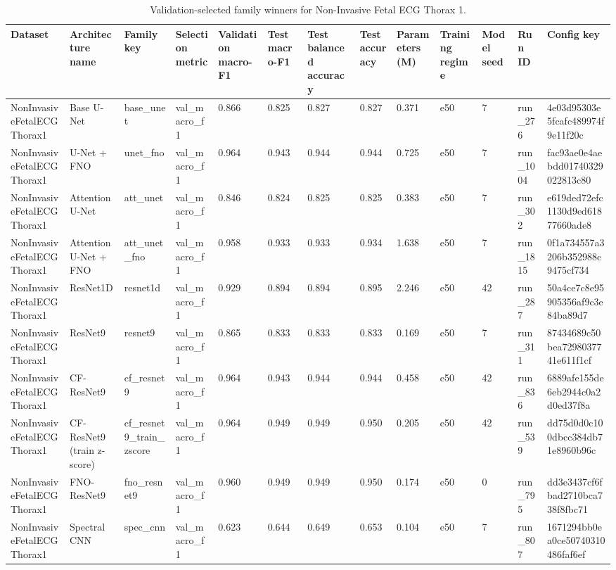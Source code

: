 \begin{table}
\caption{Validation-selected family winners for Non-Invasive Fetal ECG Thorax 1.}
\label{tab:noninvasivefetalecgthorax1_best_model_performance}
\begin{tabular}{lllllllllllll}
\toprule
Dataset & Architecture name & Family key & Selection metric & Validation macro-F1 & Test macro-F1 & Test balanced accuracy & Test accuracy & Parameters (M) & Training regime & Model seed & Run ID & Config key \\
\midrule
NonInvasiveFetalECGThorax1 & Base U-Net & base\_unet & val\_macro\_f1 & 0.866 & 0.825 & 0.827 & 0.827 & 0.371 & e50 & 7 & run\_276 & 4e03d95303e5fcafc489974f9e11f20c \\
NonInvasiveFetalECGThorax1 & U-Net + FNO & unet\_fno & val\_macro\_f1 & 0.964 & 0.943 & 0.944 & 0.944 & 0.725 & e50 & 7 & run\_1004 & fac93ae0e4aebdd01740329022813c80 \\
NonInvasiveFetalECGThorax1 & Attention U-Net & att\_unet & val\_macro\_f1 & 0.846 & 0.824 & 0.825 & 0.825 & 0.383 & e50 & 7 & run\_302 & e619ded72efc1130d9ed61877660ade8 \\
NonInvasiveFetalECGThorax1 & Attention U-Net + FNO & att\_unet\_fno & val\_macro\_f1 & 0.958 & 0.933 & 0.933 & 0.934 & 1.638 & e50 & 7 & run\_1815 & 0f1a734557a3206b352988c9475cf734 \\
NonInvasiveFetalECGThorax1 & ResNet1D & resnet1d & val\_macro\_f1 & 0.929 & 0.894 & 0.894 & 0.895 & 2.246 & e50 & 42 & run\_287 & 50a4ce7c8e95905356af9c3e84ba89d7 \\
NonInvasiveFetalECGThorax1 & ResNet9 & resnet9 & val\_macro\_f1 & 0.865 & 0.833 & 0.833 & 0.833 & 0.169 & e50 & 7 & run\_311 & 87434689c50bea7298037741e611f1cf \\
NonInvasiveFetalECGThorax1 & CF-ResNet9 & cf\_resnet9 & val\_macro\_f1 & 0.964 & 0.943 & 0.944 & 0.944 & 0.458 & e50 & 42 & run\_836 & 6889afe155de6eb2944c0a2d0ed37f8a \\
NonInvasiveFetalECGThorax1 & CF-ResNet9 (train z-score) & cf\_resnet9\_train\_zscore & val\_macro\_f1 & 0.964 & 0.949 & 0.949 & 0.950 & 0.205 & e50 & 42 & run\_539 & dd75d0d0c100dbcc384db71e8960b96c \\
NonInvasiveFetalECGThorax1 & FNO-ResNet9 & fno\_resnet9 & val\_macro\_f1 & 0.960 & 0.949 & 0.949 & 0.950 & 0.174 & e50 & 0 & run\_795 & dd3e3437cf6fbad2710bca738f8fbc71 \\
NonInvasiveFetalECGThorax1 & Spectral CNN & spec\_cnn & val\_macro\_f1 & 0.623 & 0.644 & 0.649 & 0.653 & 0.104 & e50 & 7 & run\_807 & 1671294bb0ea0ce50740310486faf6ef \\

\end{tabular}
\end{table}
